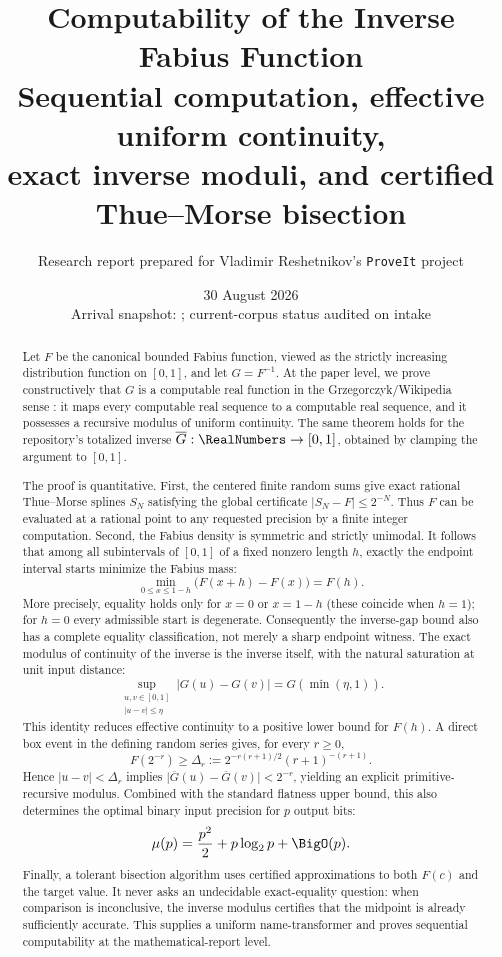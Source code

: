 \documentclass[11pt,oneside]{article}
\title{\bfseries Computability of the Inverse Fabius Function\\[0.4em]
\large Sequential computation, effective uniform continuity,\\
exact inverse moduli, and certified Thue--Morse bisection}
\author{Research report prepared for Vladimir Reshetnikov's \texttt{ProveIt} project}
\date{30 August 2026\\[0.25em]
\small Arrival snapshot: \arrivalcommit; current-corpus status audited on intake}
\theoremstyle{definition}
\theoremstyle{remark}
\numberwithin{equation}{section}
\begin{document}
\maketitle

\begin{abstract}
Let $F$ be the canonical bounded Fabius function, viewed as the strictly
increasing distribution function on $[0,1]$, and let $G=F^{-1}$.  At the
paper level, we prove constructively that $G$ is a computable real function in the
Grzegorczyk/Wikipedia sense \cite{G1957,Weihrauch2000,WikipediaCRF}: it maps every computable real sequence to a
computable real sequence, and it possesses a recursive modulus of uniform
continuity.  The same theorem holds for the repository's totalized inverse
$\overline G:\RealNumbers\to[0,1]$, obtained by clamping the argument to $[0,1]$.

The proof is quantitative.  First, the centered finite random sums give exact
rational Thue--Morse splines $S_N$ satisfying the global certificate
$\lvert S_N-F\rvert\le 2^{-N}$.  Thus $F$ can be evaluated at a rational point
to any requested precision by a finite integer computation.  Second, the
Fabius density is symmetric and strictly unimodal.  It follows that among all
subintervals of $[0,1]$ of a fixed nonzero length $h$, exactly the endpoint
interval starts minimize the Fabius mass:
\[
  \min_{0\le x\le1-h}\bigl(F(x+h)-F(x)\bigr)=F(h).
\]
More precisely, equality holds only for $x=0$ or $x=1-h$ (these coincide when
$h=1$); for $h=0$ every admissible start is degenerate.  Consequently the
inverse-gap bound also has a complete equality classification, not merely a
sharp endpoint witness.  The exact modulus of continuity of the inverse is the
inverse itself, with the natural saturation at unit input distance:
\[
  \sup_{\substack{u,v\in[0,1]\\\lvert u-v\rvert\le\eta}}
  \lvert G(u)-G(v)\rvert=G(\min(\eta,1)).
\]
This identity reduces effective continuity to a positive lower bound for
$F(h)$.  A direct box event in the defining random series gives, for every
$r\ge0$,
\[
  F(2^{-r})\ge
  \Delta_r:=2^{-r(r+1)/2}(r+1)^{-(r+1)}.
\]
Hence $\lvert u-v\rvert<\Delta_r$ implies
$\lvert\overline G(u)-\overline G(v)\rvert<2^{-r}$, yielding an explicit
primitive-recursive modulus.  Combined with the standard flatness upper bound,
this also determines the optimal binary input precision for $p$ output bits:
\[
  \mu(p)=\frac{p^2}{2}+p\log_2p+\BigO(p).
\]
Finally, a tolerant bisection algorithm uses certified approximations to both
$F(c)$ and the target value.  It never asks an undecidable exact-equality
question: when comparison is inconclusive, the inverse modulus certifies that
the midpoint is already sufficiently accurate.  This supplies a uniform
name-transformer and proves sequential computability at the
mathematical-report level.


\end{abstract}
\end{document}
